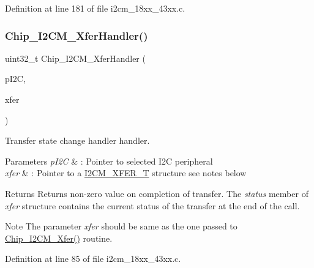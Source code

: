 Definition at line 181 of file i2cm\+\_\+18xx\+\_\+43xx.\+c.

\mbox{\label{group___i2_c_m__18_x_x__43_x_x_ga75095468463ed3ce0eb368165537780b}} 
\subsubsection{\texorpdfstring{Chip\+\_\+\+I2\+C\+M\+\_\+\+Xfer\+Handler()}{Chip\_I2CM\_XferHandler()}}
{\footnotesize\ttfamily uint32\+\_\+t Chip\+\_\+\+I2\+C\+M\+\_\+\+Xfer\+Handler (\begin{DoxyParamCaption}\item[{\hyperlink{struct_l_p_c___i2_c___t}{L\+P\+C\+\_\+\+I2\+C\+\_\+T} $\ast$}]{p\+I2C,  }\item[{\hyperlink{struct_i2_c_m___x_f_e_r___t}{I2\+C\+M\+\_\+\+X\+F\+E\+R\+\_\+T} $\ast$}]{xfer }\end{DoxyParamCaption})}



Transfer state change handler handler. 


\begin{DoxyParams}{Parameters}
{\em p\+I2C} & \+: Pointer to selected I2C peripheral \\
\hline
{\em xfer} & \+: Pointer to a \hyperlink{struct_i2_c_m___x_f_e_r___t}{I2\+C\+M\+\_\+\+X\+F\+E\+R\+\_\+T} structure see notes below \\
\hline
\end{DoxyParams}
\begin{DoxyReturn}{Returns}
Returns non-\/zero value on completion of transfer. The {\itshape status} member of {\itshape xfer} structure contains the current status of the transfer at the end of the call. 
\end{DoxyReturn}
\begin{DoxyNote}{Note}
The parameter {\itshape xfer} should be same as the one passed to \hyperlink{group___i2_c_m__18_x_x__43_x_x_gad4b7e6761dd2450e45463a5acef9ee1a}{Chip\+\_\+\+I2\+C\+M\+\_\+\+Xfer()} routine. 
\end{DoxyNote}


Definition at line 85 of file i2cm\+\_\+18xx\+\_\+43xx.\+c.

